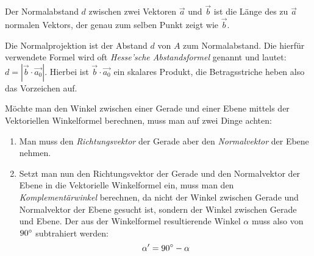 Der Normalabstand $d$ zwischen zwei Vektoren $\vec{a}$ und $\vec{b}$ ist die L\"{a}nge des zu $\vec{a}$ normalen Vektors, der genau zum selben Punkt zeigt wie $\vec{b}$.

\begin{figure}[h!]
  \centering
\end{figure}


Die Normalprojektion ist der Abstand $d$ von $A$ zum Normalabstand. Die hierf\"{u}r verwendete Formel wird oft \emph{Hesse'sche Abstandsformel} genannt und lautet: $d = |\vec{b} \cdot \vec{a_0}|$. Hierbei ist $\vec{b} \cdot \vec{a_0}$ ein skalares Produkt, die Betragsstriche heben also das Vorzeichen auf.

\begin{figure}[h!]
  \centering
\end{figure}


M\"{o}chte man den Winkel zwischen einer Gerade und einer Ebene mittels der Vektoriellen Winkelformel berechnen, muss man auf zwei Dinge achten:

\begin{enumerate}
  \item Man muss den \emph{Richtungsvektor} der Gerade aber den \emph{Normalvektor} der Ebene nehmen.

  \item Setzt man nun den Richtungsvektor der Gerade und den Normalvektor der Ebene in die Vektorielle Winkelformel ein, muss man den \emph{Komplement\"{a}rwinkel} berechnen, da nicht der Winkel zwischen Gerade und Normalvektor der Ebene gesucht ist, sondern der Winkel zwischen Gerade und Ebene. Der aus der Winkelformel resultierende Winkel $\alpha$ muss also von $90\degree$ subtrahiert werden: $$\alpha' = 90\degree - \alpha$$
\end{enumerate}

